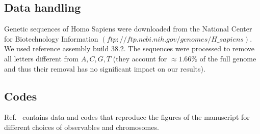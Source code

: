 \documentclass[fleqn,10pt]{wlscirep}
\begin{document}
\subsection*{Data handling}
Genetic sequences of Homo Sapiens  were downloaded from the National Center for Biotechnology Information  $( ftp://ftp.ncbi.nih.gov/genomes/H\_sapiens )$. We used reference assembly build 38.2.
The sequences were processed to remove  all letters different from $A,C,G,T$ (they account for $\approx 1.66\%$ of the full genome and thus their removal has no significant impact on our results).

\subsection*{Codes}

Ref.~\cite{zenodo} contains data and codes that reproduce the figures of the manuscript for different choices of observables and chromosomes. 
\end{document}
